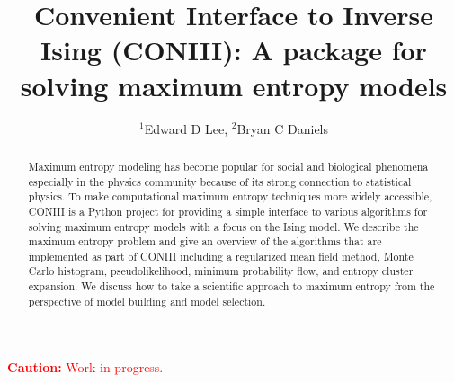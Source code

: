 \documentclass[aps,prl,twocolumn]{revtex4-1}
\begin{document}
\newcommand{\mr}[1]{\mathrm{#1}}
\newcommand{\mb}[1]{\mathbf{#1}}
\newcommand{\br}[1]{\left<#1\right>}
\newcommand{\bl}[1]{\left|#1\right|}
\newcommand{\mc}[1]{\mathcal{#1}}
\newcommand{\tb}[1]{\textcolor{blue}{#1}}
\newcommand{\tr}[1]{\textcolor{red}{#1}}
\newcommand{\tg}[1]{\textcolor{green}{#1}}
\newcommand{\si}[0]{\sigma_{\rm i}}
\newcommand{\sj}[0]{\sigma_{\rm j}}
\newcommand{\bs}[1]{\boldsymbol{#1}}

\title{Convenient Interface to Inverse Ising (CONIII): A package for solving maximum entropy models}
\author{$^1$Edward D Lee, $^2$Bryan C Daniels}

\begin{abstract}
Maximum entropy modeling has become popular for social and biological phenomena especially in the physics community because of its strong connection to statistical physics. To make computational maximum entropy techniques more widely accessible, CONIII is a Python project for providing a simple interface to various algorithms for solving maximum entropy models with a focus on the Ising model. We describe the maximum entropy problem and give an overview of the algorithms that are implemented as part of CONIII including a regularized mean field method, Monte Carlo histogram, pseudolikelihood, minimum probability flow, and entropy cluster expansion. We discuss how to take a scientific approach to maximum entropy from the perspective of model building and model selection.
\end{abstract}

\maketitle

\tr{{\bf Caution:} Work in progress.}
\end{document}
